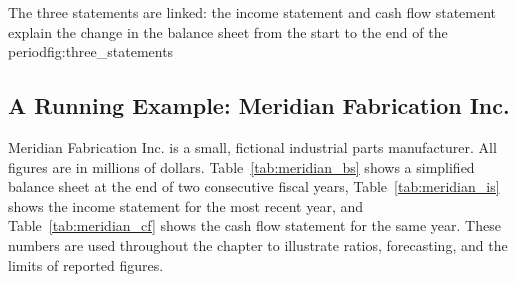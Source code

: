 \documentclass[../ai_in_finance]{subfiles}
\begin{document}
\begin{bookfigure}[htbp]{The three statements are linked: the income statement and cash flow statement explain the change in the balance sheet from the start to the end of the period}{fig:three_statements}
\end{bookfigure}

\subsection{A Running Example: Meridian Fabrication Inc.}

Meridian Fabrication Inc. is a small, fictional industrial parts manufacturer. All figures are in millions of dollars. Table~\ref{tab:meridian_bs} shows a simplified balance sheet at the end of two consecutive fiscal years, Table~\ref{tab:meridian_is} shows the income statement for the most recent year, and Table~\ref{tab:meridian_cf} shows the cash flow statement for the same year. These numbers are used throughout the chapter to illustrate ratios, forecasting, and the limits of reported figures.
\end{document}
